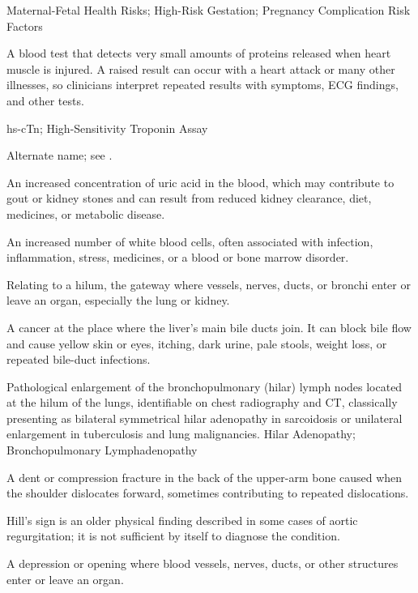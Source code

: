 \synonyms
Maternal-Fetal Health Risks; High-Risk Gestation; Pregnancy Complication Risk Factors

 A blood test that detects very small amounts of proteins released when heart muscle is injured. A raised result can occur with a heart attack or many other illnesses, so clinicians interpret repeated results with symptoms, ECG findings, and other tests.

\synonyms
hs-cTn; High-Sensitivity Troponin Assay

 Alternate name; see .

 An increased concentration of uric acid in the blood, which may contribute to gout or kidney stones and can result from reduced kidney clearance, diet, medicines, or metabolic disease.

 An increased number of white blood cells, often associated with infection, inflammation, stress, medicines, or a blood or bone marrow disorder.

 Relating to a hilum, the gateway where vessels, nerves, ducts, or bronchi enter or leave an organ, especially the lung or kidney.

 A cancer at the place where the liver’s main bile ducts join. It can block bile flow and cause yellow skin or eyes, itching, dark urine, pale stools, weight loss, or repeated bile-duct infections.

 Pathological enlargement of the bronchopulmonary (hilar) lymph nodes located at the hilum of the lungs, identifiable on chest radiography and CT, classically presenting as bilateral symmetrical hilar adenopathy in sarcoidosis or unilateral enlargement in tuberculosis and lung malignancies.
\synonyms
Hilar Adenopathy; Bronchopulmonary Lymphadenopathy

 A dent or compression fracture in the back of the upper-arm bone caused when the shoulder dislocates forward, sometimes contributing to repeated dislocations.

 Hill's sign is an older physical finding described in some cases of aortic regurgitation; it is not sufficient by itself to diagnose the condition.

 A depression or opening where blood vessels, nerves, ducts, or other structures enter or leave an organ.

